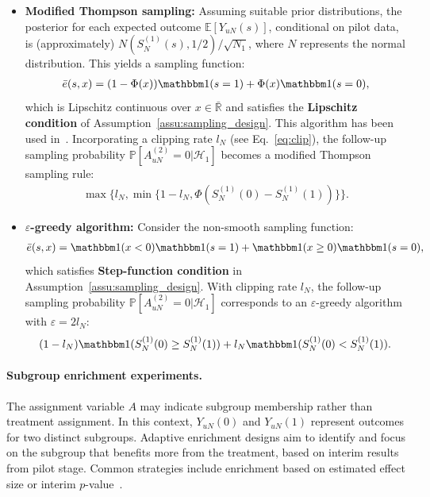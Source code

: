 \documentclass[12pt]{article}
\def\P{\mathbb{P}}
\def\P{\mathbb{P}}
\newcommand{\E}{\mathbb E}								%
\renewcommand{\P}{\mathbb{P}}							%
\newcommand{\indicator}{\mathbbm 1}						%
\begin{document}
\begin{itemize}
    \item \textbf{Modified Thompson sampling:}  
    Assuming suitable prior distributions, the posterior for each expected outcome $\E[Y_{uN}(s)]$, conditional on pilot data, is (approximately) $N(S_N^{(1)}(s), 1/2)/\sqrt{N_1}$, where $N$ represents the normal distribution. This yields a sampling function:
    \begin{align*}
        \bar e(s, x) = (1 - \Phi(x)) \indicator(s = 1) + \Phi(x) \indicator(s = 0),
    \end{align*}
    which is Lipschitz continuous over $x \in \bar{\mathbb{R}}$ and satisfies the \textbf{Lipschitz condition} of Assumption~\ref{assu:sampling_design}. This algorithm has been used in~\citet{Hadad2021}. Incorporating a clipping rate $l_N$ (see Eq.~\eqref{eq:clip}), the follow-up sampling probability $\P[A_{uN}^{(2)} = 0|\mathcal{H}_{1}]$ becomes a modified Thompson sampling rule:
    \begin{align}\label{eq:modified-cliped-TS}
        \max\{l_N, \min\{1-l_N,\Phi(S_N^{(1)}(0) - S_N^{(1)}(1))\}\}.
    \end{align}

    \item \textbf{$\varepsilon$-greedy algorithm:}  
    Consider the non-smooth sampling function:
    \begin{align*}
        \bar e(s, x) = \indicator(x < 0)\indicator(s = 1) + \indicator(x \geq 0)\indicator(s = 0),
    \end{align*}
    which satisfies \textbf{Step-function condition} in Assumption~\ref{assu:sampling_design}. With clipping rate $l_N$, the follow-up sampling probability $\P[A_{uN}^{(2)} = 0|\mathcal{H}_{1}]$ corresponds to an $\varepsilon$-greedy algorithm with $\varepsilon = 2l_N$:
    \begin{align}\label{eq:eps-greedy}
        (1-l_N)\indicator(S_N^{(1)}(0) \geq S_N^{(1)}(1)) + l_N\indicator(S_N^{(1)}(0) < S_N^{(1)}(1)).
    \end{align}
\end{itemize}

\paragraph{Subgroup enrichment experiments.}

The assignment variable $A$ may indicate subgroup membership rather than treatment assignment. In this context, $Y_{uN}(0)$ and $Y_{uN}(1)$ represent outcomes for two distinct subgroups. Adaptive enrichment designs aim to identify and focus on the subgroup that benefits more from the treatment, based on interim results from pilot stage. Common strategies include enrichment based on estimated effect size or interim $p$-value~\citep{us2019adaptive,ben2024adaptive}.
\end{document}
